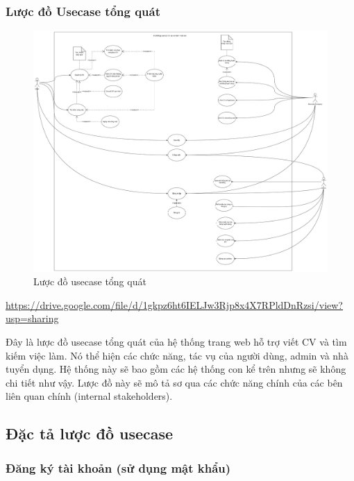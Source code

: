 \subsubsection{Lược đồ Usecase tổng quát }
\begin{figure}[H]

	\centering
     \includegraphics[scale = 0.05]{img/overview_usecase.png}
    \caption{Lược đồ usecase tổng quát}
\end{figure}

\url{https://drive.google.com/file/d/1gkpz6ht6IELJw3Rjp8x4X7RPldDnRzsi/view?usp=sharing}


Đây là lược đồ usecase tổng quát của hệ thống trang web hỗ trợ viết CV và tìm kiếm việc làm. Nó thể hiện các chức năng, tác vụ của người dùng, admin và nhà tuyển dụng. Hệ thống này sẽ bao gồm các hệ thống con kể trên nhưng sẽ không chi tiết như vậy. Lược đồ này sẽ mô tả sơ qua các chức năng chính của các bên liên quan chính (internal stakeholders). 

\subsection{Đặc tả lược đồ usecase}


\subsubsection{Đăng ký tài khoản (sử dụng mật khẩu)}


